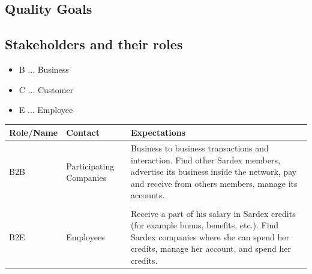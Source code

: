 \subsection{Quality Goals}\label{_quality_goals}

\subsection{Stakeholders and their roles}\label{_stakeholders}

\begin{itemize}
	\item B ... Business
	\item C ... Customer
	\item E ... Employee	
\end{itemize}

\begin{longtable}[]{@{}lll@{}}
\toprule
\begin{minipage}[b]{0.18\columnwidth}\raggedright\strut
Role/Name\strut
\end{minipage} & \begin{minipage}[b]{0.37\columnwidth}\raggedright\strut
Contact\strut
\end{minipage} & \begin{minipage}[b]{0.37\columnwidth}\raggedright\strut
Expectations\strut
\end{minipage}\tabularnewline
\midrule
\endhead
\begin{minipage}[t]{0.18\columnwidth}B2B \end{minipage} &
\begin{minipage}[t]{0.37\columnwidth}Participating Companies \end{minipage} &
\begin{minipage}[t]{0.37\columnwidth}Business to business transactions and interaction. Find other Sardex members, advertise its business inside the network, pay and receive from others members, manage its accounts.\end{minipage}
\tabularnewline
\tabularnewline
\begin{minipage}[t]{0.18\columnwidth}B2E \end{minipage} &
\begin{minipage}[t]{0.37\columnwidth}Employees \end{minipage} &
\begin{minipage}[t]{0.37\columnwidth}Receive a part of his salary in Sardex credits (for example bonus, benefits, etc.). Find Sardex companies where she can spend her credits, manage her account, and spend her credits.\end{minipage}

\end{longtable}
